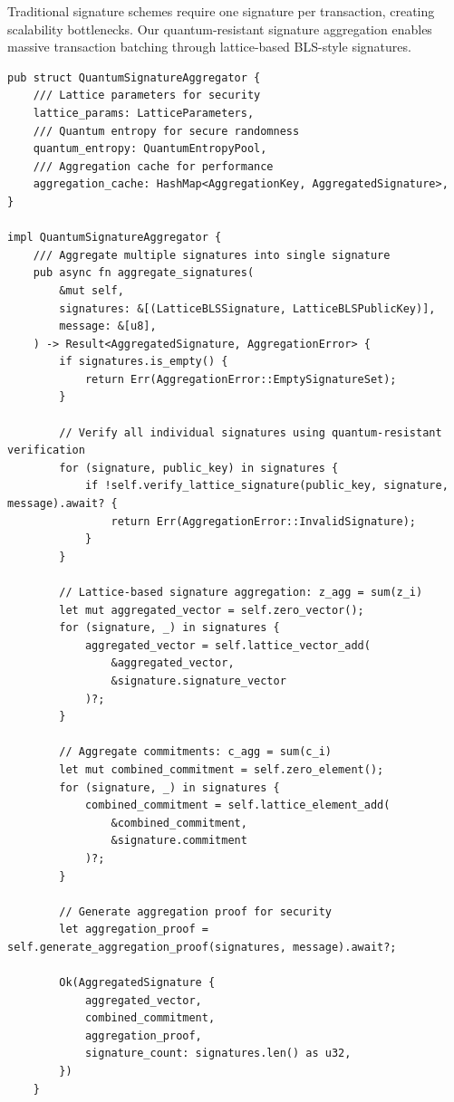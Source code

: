 \documentclass[12pt,a4paper]{article}
\begin{document}
Traditional signature schemes require one signature per transaction, creating scalability bottlenecks. Our quantum-resistant signature aggregation enables massive transaction batching through lattice-based BLS-style signatures.

\begin{lstlisting}[style=rustcode, caption=Quantum Signature Aggregation]
pub struct QuantumSignatureAggregator {
    /// Lattice parameters for security
    lattice_params: LatticeParameters,
    /// Quantum entropy for secure randomness
    quantum_entropy: QuantumEntropyPool,
    /// Aggregation cache for performance
    aggregation_cache: HashMap<AggregationKey, AggregatedSignature>,
}

impl QuantumSignatureAggregator {
    /// Aggregate multiple signatures into single signature
    pub async fn aggregate_signatures(
        &mut self,
        signatures: &[(LatticeBLSSignature, LatticeBLSPublicKey)],
        message: &[u8],
    ) -> Result<AggregatedSignature, AggregationError> {
        if signatures.is_empty() {
            return Err(AggregationError::EmptySignatureSet);
        }
        
        // Verify all individual signatures using quantum-resistant verification
        for (signature, public_key) in signatures {
            if !self.verify_lattice_signature(public_key, signature, message).await? {
                return Err(AggregationError::InvalidSignature);
            }
        }
        
        // Lattice-based signature aggregation: z_agg = sum(z_i)
        let mut aggregated_vector = self.zero_vector();
        for (signature, _) in signatures {
            aggregated_vector = self.lattice_vector_add(
                &aggregated_vector, 
                &signature.signature_vector
            )?;
        }
        
        // Aggregate commitments: c_agg = sum(c_i)
        let mut combined_commitment = self.zero_element();
        for (signature, _) in signatures {
            combined_commitment = self.lattice_element_add(
                &combined_commitment, 
                &signature.commitment
            )?;
        }
        
        // Generate aggregation proof for security
        let aggregation_proof = self.generate_aggregation_proof(signatures, message).await?;
        
        Ok(AggregatedSignature {
            aggregated_vector,
            combined_commitment,
            aggregation_proof,
            signature_count: signatures.len() as u32,
        })
    }
    

\end{lstlisting}
\end{document}
